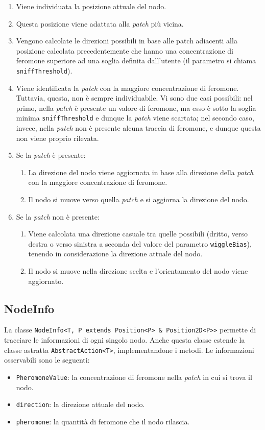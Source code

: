 \begin{enumerate}
    \item Viene individuata la posizione attuale del nodo.
    \item Questa posizione viene adattata alla \textit{patch} più vicina.
    \item Vengono calcolate le direzioni possibili in base alle patch adiacenti alla posizione calcolata precedentemente che hanno una 
    concentrazione di feromone superiore ad una soglia definita dall'utente (il parametro si chiama \texttt{sniffThreshold}).
    \item Viene identificata la \textit{patch} con la maggiore concentrazione di feromone. Tuttavia, questa, non è sempre individuabile. Vi sono due casi possibili: nel primo, 
        nella \textit{patch} è presente un valore di feromone, ma esso è sotto la soglia minima \texttt{sniffThreshold} e dunque la \textit{patch} viene scartata;
         nel secondo caso, invece, nella \textit{patch} non è presente alcuna traccia di feromone, e dunque questa non viene proprio rilevata.
    \item Se la \textit{patch} è presente:
    \begin{enumerate}
        \item La direzione del nodo viene aggiornata in base alla direzione della \textit{patch} con la maggiore concentrazione di feromone.
        \item Il nodo si muove verso quella \textit{patch} e si aggiorna la direzione del nodo.
    \end{enumerate}
    \item Se la \textit{patch} non è presente:
    \begin{enumerate}
        \item Viene calcolata una direzione casuale tra quelle possibili (dritto, verso destra o verso sinistra a seconda del valore del parametro \texttt{wiggleBias}),
        tenendo in considerazione la direzione attuale del nodo.
        \item Il nodo si muove nella direzione scelta e l'orientamento del nodo viene aggiornato.
    \end{enumerate}
\end{enumerate}

\subsection{NodeInfo}
La classe \texttt{NodeInfo<T, P extends Position<P> \& Position2D<P>>} permette di tracciare le informazioni di ogni singolo nodo. Anche questa
classe estende la classe astratta \texttt{AbstractAction<T>}, implementandone i metodi. Le informazioni osservabili sono le seguenti:
\begin{itemize}
    \item \texttt{PheromoneValue}: la concentrazione di feromone nella \textit{patch} in cui si trova il nodo.
    \item \texttt{direction}: la direzione attuale del nodo.
    \item \texttt{pheromone}: la quantità di feromone che il nodo rilascia.
\end{itemize}

